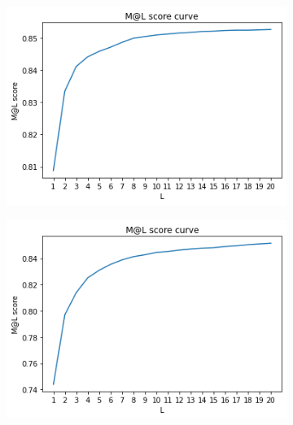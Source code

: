 \begin{figure}[htbp]
	\centering
	\begin{subfigure}[b]{0.48\textwidth}
		\centering
		\includegraphics[width=\textwidth]{figure/partA_bm25_ml_score.png}
		\caption{}
		\label{fig: bm25_mlscore}
	\end{subfigure}
	\hfill
	\begin{subfigure}[b]{0.48\textwidth}
		\centering
		\includegraphics[width=\textwidth]{figure/partA_sent2vec_ml_score.png}
		\caption{}
		\label{fig: sent2vec_mlscore}
	\end{subfigure}
	\hfill
	\begin{subfigure}[b]{0.48\textwidth}
		\centering

\end{subfigure}
\end{figure}
